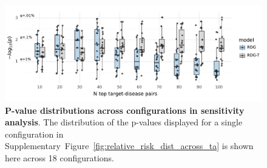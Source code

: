 \documentclass{article}
\begin{document}
\begin{figure}[H]
  \centering
  \captionsetup{width=.9\linewidth}
  \includegraphics[width=1\textwidth]{sensitivity_p_values.pdf}
  \caption{
    \textbf{P-value distributions across configurations in sensitivity analysis}.
    The distribution of the p-values displayed for a single configuration in Supplementary~Figure~\ref{fig:relative_risk_dist_across_ta} is shown here across 18 configurations.
  }
  \label{fig:sensitivity_p_values}
\end{figure}

\pagebreak

  
 
\end{document}
